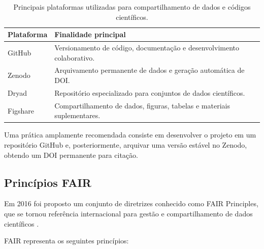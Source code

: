 \documentclass{ueap-sdm}
\begin{document}
\begin{table}[H]
	\centering
	\caption{Principais plataformas utilizadas para compartilhamento de dados e códigos científicos.}
	\label{tab:repositorios_ciencia_aberta}
	
	\begin{tabular}{
			p{}
			p{}
		}
		
		\toprule
		
		\textbf{Plataforma} &
		\textbf{Finalidade principal}
		
		\\
		\midrule
		
		GitHub &
		Versionamento de código, documentação e desenvolvimento colaborativo.
		
		\\
		
		Zenodo &
		Arquivamento permanente de dados e geração automática de DOI.
		
		\\
		
		Dryad &
		Repositório especializado para conjuntos de dados científicos.
		
		\\
		
		Figshare &
		Compartilhamento de dados, figuras, tabelas e materiais suplementares.
		
		\\
		
		\bottomrule
		
	\end{tabular}
	
\end{table}

Uma prática amplamente recomendada consiste em desenvolver o projeto em um
repositório GitHub e, posteriormente, arquivar uma versão estável no Zenodo,
obtendo um DOI permanente para citação.

\subsection{Princípios FAIR}

Em 2016 foi proposto um conjunto de diretrizes conhecido como FAIR Principles,
que se tornou referência internacional para gestão e compartilhamento de dados
científicos \citep{wilkinson2016fair}.

FAIR representa os seguintes princípios:
\end{document}
